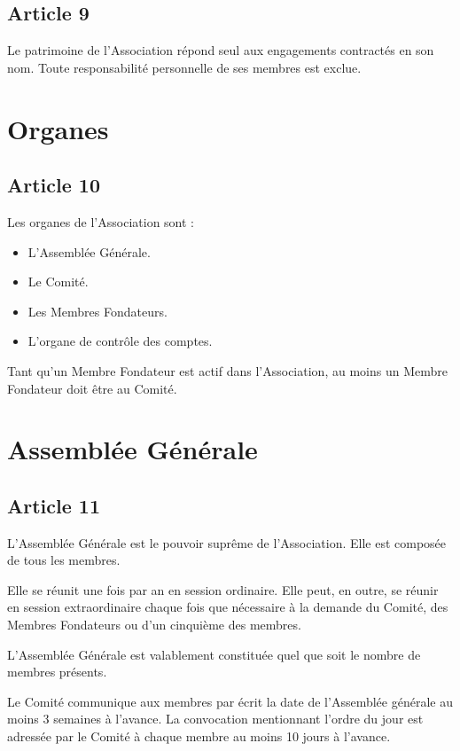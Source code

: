 \documentclass[12pt,twoside]{report}
\begin{document}
\section*{Article 9}
Le patrimoine de l'Association répond seul aux engagements contractés en son nom. Toute responsabilité personnelle de ses membres est exclue.

\chapter*{Organes}

\section*{Article 10}
Les organes de l’Association sont :
\begin{itemize}
\item L’Assemblée Générale.
\item Le Comité.
\item Les Membres Fondateurs.
\item L’organe de contrôle des comptes.
\end{itemize}

Tant qu’un Membre Fondateur est actif dans l’Association, au moins un Membre Fondateur doit être au Comité.

\chapter*{Assemblée Générale}

\section*{Article 11}
L’Assemblée Générale est le pouvoir suprême de l’Association. Elle est composée de tous les membres.

Elle se réunit une fois par an en session ordinaire. Elle peut, en outre, se réunir en session extraordinaire chaque fois que nécessaire à la demande du Comité, des Membres Fondateurs ou d’un cinquième des membres.

L’Assemblée Générale est valablement constituée quel que soit le nombre de membres présents.

Le Comité communique aux membres par écrit la date de l'Assemblée générale au moins 3 semaines à l'avance. La convocation mentionnant l'ordre du jour est adressée par le Comité à chaque membre au moins 10 jours à l'avance.
\end{document}
